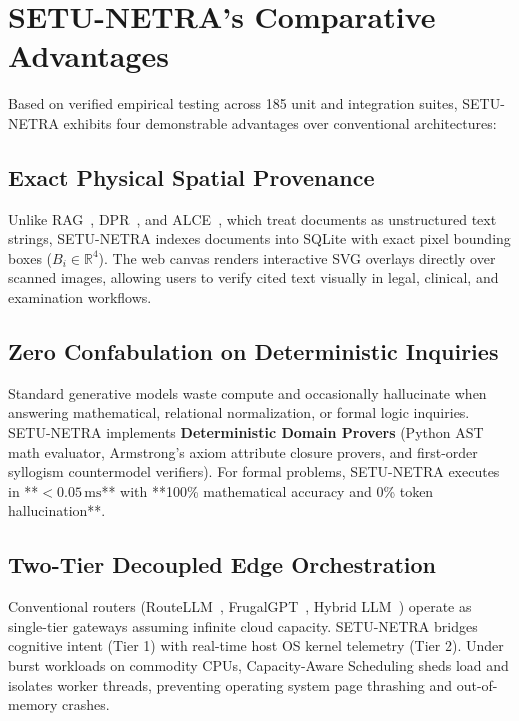 \documentclass[11pt,a4paper]{article}
\begin{document}
\section{SETU-NETRA's Comparative Advantages}
\label{sec:advantages}

Based on verified empirical testing across 185 unit and integration suites, SETU-NETRA exhibits four demonstrable advantages over conventional architectures:

\subsection{Exact Physical Spatial Provenance}
Unlike RAG~\cite{Lewis2020RAG}, DPR~\cite{Karpukhin2020DPR}, and ALCE~\cite{Gao2023ALCE}, which treat documents as unstructured text strings, SETU-NETRA indexes documents into SQLite with exact pixel bounding boxes ($B_i \in \mathbb{R}^4$). The web canvas renders interactive SVG overlays directly over scanned images, allowing users to verify cited text visually in legal, clinical, and examination workflows.

\subsection{Zero Confabulation on Deterministic Inquiries}
Standard generative models waste compute and occasionally hallucinate when answering mathematical, relational normalization, or formal logic inquiries. SETU-NETRA implements \textbf{Deterministic Domain Provers} (Python AST math evaluator, Armstrong's axiom attribute closure provers, and first-order syllogism countermodel verifiers). For formal problems, SETU-NETRA executes in **$< 0.05\,\text{ms}$** with **100\% mathematical accuracy and 0\% token hallucination**.

\subsection{Two-Tier Decoupled Edge Orchestration}
Conventional routers (RouteLLM~\cite{Ong2024RouteLLM}, FrugalGPT~\cite{Chen2023FrugalGPT}, Hybrid LLM~\cite{Ding2024HybridLLM}) operate as single-tier gateways assuming infinite cloud capacity. SETU-NETRA bridges cognitive intent (Tier 1) with real-time host OS kernel telemetry (Tier 2). Under burst workloads on commodity CPUs, Capacity-Aware Scheduling sheds load and isolates worker threads, preventing operating system page thrashing and out-of-memory crashes.
\end{document}
